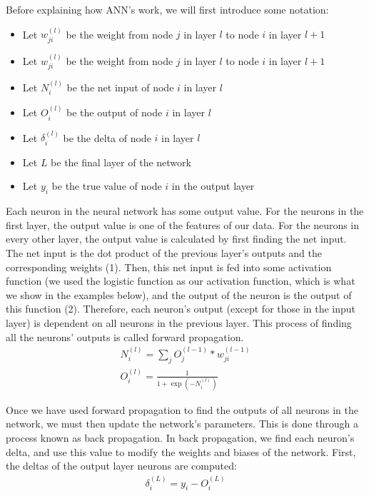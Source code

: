 \documentclass[11pt,letterpaper]{article}
\begin{document}
Before explaining how ANN's work, we will first introduce some notation:
\begin{itemize}
    \item Let $w^{(l)}_{ji}$ be the weight from node $j$ in layer $l$ to node $i$ in layer $l + 1$
    \item Let $w^{(l)}_{ji}$ be the weight from node $j$ in layer $l$ to node $i$ in layer $l + 1$
    \item Let $N^{(l)}_i$ be the net input of node $i$ in layer $l$
    \item Let $O^{(l)}_i$ be the output of node $i$ in layer $l$ \item Let $\delta^{(l)}_i$ be the delta of node $i$ in layer $l$
    \item Let $L$ be the final layer of the network
    \item Let $y_i$ be the true value of node $i$ in the output layer
\end{itemize}
Each neuron in the neural network has some output value. For the neurons in the first layer, the output value is one of the features of our data. For the neurons in every other layer, the output value is calculated by first finding the net input. The net input is the dot product of the previous layer’s outputs and the corresponding weights (1). Then, this net input is fed into some activation function (we used the logistic function as our activation function, which is what we show in the examples below), and the output of the neuron is the output of this function (2). Therefore, each neuron’s output (except for those in the input layer) is dependent on all neurons in the previous layer. This process of finding all the neurons’ outputs is called forward propagation.
\begin{align}
    N^{(l)}_i = \sum_j O^{(l-1)}_j * w^{(l-1)}_{ji}\\
    O^{(l)}_i = \frac{1}{1 + \exp(-N^{(l)}_i)}
\end{align}

Once we have used forward propagation to find the outputs of all neurons in the network, we must then update the network’s parameters. This is done through a process known as back propagation. In back propagation, we find each neuron’s delta, and use this value to modify the weights and biases of the network. First, the deltas of the output layer neurons are computed:
\begin{align}
    \delta^{(L)}_i = y_i - O^{(L)}_i
\end{align}
\end{document}
